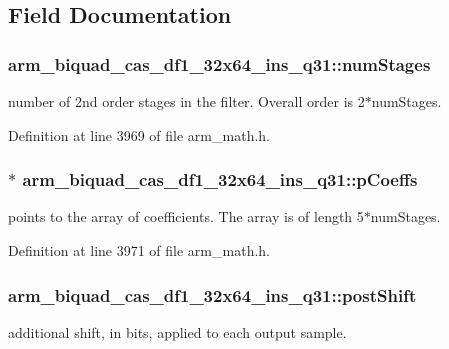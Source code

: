 \subsection{Field Documentation}
\hypertarget{structarm__biquad__cas__df1__32x64__ins__q31_ad7cb9a9f5df8f4fcfc7a0b633672e574}{
\subsubsection[{num\-Stages}]{ arm\-\_\-biquad\-\_\-cas\-\_\-df1\-\_\-32x64\-\_\-ins\-\_\-q31\-::num\-Stages}}\label{structarm__biquad__cas__df1__32x64__ins__q31_ad7cb9a9f5df8f4fcfc7a0b633672e574}
number of 2nd order stages in the filter. Overall order is 2$\ast$num\-Stages. 

Definition at line 3969 of file arm\-\_\-math.\-h.

\hypertarget{structarm__biquad__cas__df1__32x64__ins__q31_a490462d6ebe0fecfb6acbf51bed22ecf}{
\subsubsection[{p\-Coeffs}]{$\ast$ arm\-\_\-biquad\-\_\-cas\-\_\-df1\-\_\-32x64\-\_\-ins\-\_\-q31\-::p\-Coeffs}}\label{structarm__biquad__cas__df1__32x64__ins__q31_a490462d6ebe0fecfb6acbf51bed22ecf}
points to the array of coefficients. The array is of length 5$\ast$num\-Stages. 

Definition at line 3971 of file arm\-\_\-math.\-h.

\hypertarget{structarm__biquad__cas__df1__32x64__ins__q31_a8e9d58e8dba5aa3b2fc4f36d2ed07996}{
\subsubsection[{post\-Shift}]{ arm\-\_\-biquad\-\_\-cas\-\_\-df1\-\_\-32x64\-\_\-ins\-\_\-q31\-::post\-Shift}}\label{structarm__biquad__cas__df1__32x64__ins__q31_a8e9d58e8dba5aa3b2fc4f36d2ed07996}
additional shift, in bits, applied to each output sample. 

